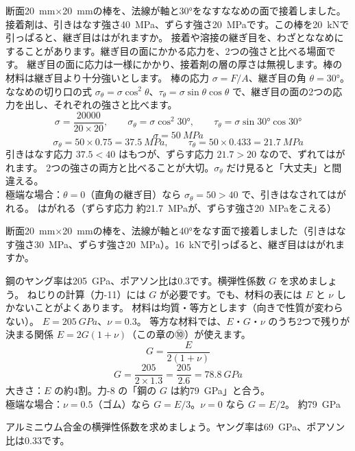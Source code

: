 \begin{phreidai}[ななめに接着した継ぎ目]
\label{ph:力-9:ex11}断面\qty{20}{mm}×\qty{20}{mm}の棒を、法線が軸と30°をなすななめの面で接着しました。接着剤は、引きはなす強さ\qty{40}{MPa}、ずらす強さ\qty{20}{MPa}です。この棒を\qty{20}{kN}で引っぱると、継ぎ目ははがれますか。
\phbamen
接着や溶接の継ぎ目を、わざとななめにすることがあります。継ぎ目の面にかかる応力を、2つの強さと比べる場面です。
\phmushi
継ぎ目の面に応力は一様にかかり、接着剤の層の厚さは無視します。棒の材料は継ぎ目より十分強いとします。
\phzu
棒の応力 $\sigma=F/A$、継ぎ目の角 $\theta=30°$。
\phriyu
ななめの切り口の式 $\sigma_\theta=\sigma\cos^2\theta$、$\tau_\theta=\sigma\sin\theta\cos\theta$ で、継ぎ目の面の2つの応力を出し、それぞれの強さと比べます。
\phtateru
\[\sigma=\frac{\num{20000}}{20\times20},\qquad\sigma_\theta=\sigma\cos^2 30°,\qquad\tau_\theta=\sigma\sin30°\cos30°\]
\phtoku
\[\sigma=\qty{50}{MPa}\]
\[\sigma_\theta=50\times0.75=\qty{37.5}{MPa},\qquad\tau_\theta=50\times0.433=\qty{21.7}{MPa}\]
引きはなす応力 $37.5<40$ はもつが、ずらす応力 $21.7>20$ なので、ずれてはがれます。
\phtashikame
2つの強さの両方と比べることが大切。$\sigma_\theta$ だけ見ると「大丈夫」と間違える。\\
極端な場合：$\theta=0$（直角の継ぎ目）なら $\sigma_\theta=50>40$ で、引きはなされてはがれる。
\kotae はがれる（ずらす応力 約\qty{21.7}{MPa}が、ずらす強さ\qty{20}{MPa}をこえる）
\end{phreidai}
\begin{jibun}
断面\qty{20}{mm}×\qty{20}{mm}の棒を、法線が軸と40°をなす面で接着しました（引きはなす強さ\qty{30}{MPa}、ずらす強さ\qty{20}{MPa}）。\qty{16}{kN}で引っぱると、継ぎ目ははがれますか。
\end{jibun}

\begin{phreidai}[$E$ と $\nu$ から $G$ を求める]
\label{ph:力-9:ex12}鋼のヤング率は\qty{205}{GPa}、ポアソン比は0.3です。横弾性係数 $G$ を求めましょう。
\phbamen
ねじりの計算（力-11）には $G$ が必要です。でも、材料の表には $E$ と $\nu$ しかないことがよくあります。
\phmushi
材料は均質・等方とします（向きで性質が変わらない）。
\phzu
$E=\qty{205}{GPa}$、$\nu=0.3$。
\phriyu
等方な材料では、$E$・$G$・$\nu$ のうち2つで残りが決まる関係 $E=2G(1+\nu)$（この章の⑩）が使えます。
\phtateru
\[G=\frac{E}{2(1+\nu)}\]
\phtoku
\[G=\frac{205}{2\times1.3}=\frac{205}{2.6}=\qty{78.8}{GPa}\]
\phtashikame
大きさ：$E$ の約4割。力-8 の「鋼の $G$ は約\qty{79}{GPa}」と合う。\\
極端な場合：$\nu=0.5$（ゴム）なら $G=E/3$。$\nu=0$ なら $G=E/2$。
\kotae 約\qty{79}{GPa}
\end{phreidai}
\begin{jibun}
アルミニウム合金の横弾性係数を求めましょう。ヤング率は\qty{69}{GPa}、ポアソン比は0.33です。
\end{jibun}

